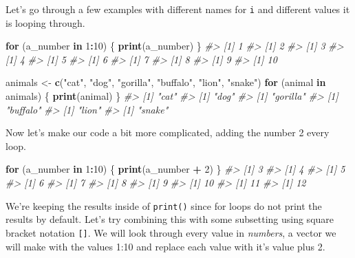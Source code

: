 \documentclass[
  12pt,
]{book}
\newenvironment{Shaded}{\begin{snugshade}}{\end{snugshade}}
\newcommand{\CommentTok}[1]{\textcolor[rgb]{0.56,0.35,0.01}{\textit{#1}}}
\newcommand{\ControlFlowTok}[1]{\textcolor[rgb]{0.13,0.29,0.53}{\textbf{#1}}}
\newcommand{\DecValTok}[1]{\textcolor[rgb]{0.00,0.00,0.81}{#1}}
\newcommand{\KeywordTok}[1]{\textcolor[rgb]{0.13,0.29,0.53}{\textbf{#1}}}
\newcommand{\NormalTok}[1]{#1}
\newcommand{\OperatorTok}[1]{\textcolor[rgb]{0.81,0.36,0.00}{\textbf{#1}}}
\newcommand{\StringTok}[1]{\textcolor[rgb]{0.31,0.60,0.02}{#1}}
\begin{document}
Let's go through a few examples with different names for \texttt{i} and different values it is looping through.

\begin{Shaded}
\begin{Highlighting}[]
\ControlFlowTok{for}\NormalTok{ (a\_number }\ControlFlowTok{in} \DecValTok{1}\OperatorTok{:}\DecValTok{10}\NormalTok{) \{}
   \KeywordTok{print}\NormalTok{(a\_number)}
\NormalTok{\}}
\CommentTok{\#> [1] 1}
\CommentTok{\#> [1] 2}
\CommentTok{\#> [1] 3}
\CommentTok{\#> [1] 4}
\CommentTok{\#> [1] 5}
\CommentTok{\#> [1] 6}
\CommentTok{\#> [1] 7}
\CommentTok{\#> [1] 8}
\CommentTok{\#> [1] 9}
\CommentTok{\#> [1] 10}
\end{Highlighting}
\end{Shaded}

\begin{Shaded}
\begin{Highlighting}[]
\NormalTok{animals <{-}}\StringTok{ }\KeywordTok{c}\NormalTok{(}\StringTok{"cat"}\NormalTok{, }\StringTok{"dog"}\NormalTok{, }\StringTok{"gorilla"}\NormalTok{, }\StringTok{"buffalo"}\NormalTok{, }\StringTok{"lion"}\NormalTok{, }\StringTok{"snake"}\NormalTok{)}
\ControlFlowTok{for}\NormalTok{ (animal }\ControlFlowTok{in}\NormalTok{ animals) \{}
   \KeywordTok{print}\NormalTok{(animal)}
\NormalTok{\}}
\CommentTok{\#> [1] "cat"}
\CommentTok{\#> [1] "dog"}
\CommentTok{\#> [1] "gorilla"}
\CommentTok{\#> [1] "buffalo"}
\CommentTok{\#> [1] "lion"}
\CommentTok{\#> [1] "snake"}
\end{Highlighting}
\end{Shaded}

Now let's make our code a bit more complicated, adding the number 2 every loop.

\begin{Shaded}
\begin{Highlighting}[]
\ControlFlowTok{for}\NormalTok{ (a\_number }\ControlFlowTok{in} \DecValTok{1}\OperatorTok{:}\DecValTok{10}\NormalTok{) \{}
   \KeywordTok{print}\NormalTok{(a\_number }\OperatorTok{+}\StringTok{ }\DecValTok{2}\NormalTok{)}
\NormalTok{\}}
\CommentTok{\#> [1] 3}
\CommentTok{\#> [1] 4}
\CommentTok{\#> [1] 5}
\CommentTok{\#> [1] 6}
\CommentTok{\#> [1] 7}
\CommentTok{\#> [1] 8}
\CommentTok{\#> [1] 9}
\CommentTok{\#> [1] 10}
\CommentTok{\#> [1] 11}
\CommentTok{\#> [1] 12}
\end{Highlighting}
\end{Shaded}

We're keeping the results inside of \texttt{print()} since for loops do not print the results by default. Let's try combining this with some subsetting using square bracket notation \texttt{{[}{]}}. We will look through every value in \emph{numbers}, a vector we will make with the values 1:10 and replace each value with it's value plus 2.
\end{document}
